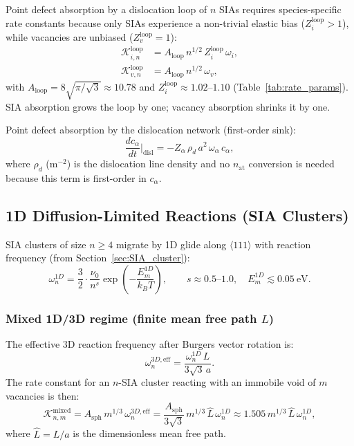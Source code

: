 \documentclass[pdflatex,sn-basic]{sn-jnl} %
\begin{document}
Point defect absorption by a dislocation loop of $n$ SIAs requires
species-specific rate constants because only SIAs experience a non-trivial
elastic bias ($Z_i^{\mathrm{loop}} > 1$), while vacancies are unbiased
($Z_v^{\mathrm{loop}} = 1$):
\begin{align}
    \mathcal{K}_{i,n}^{\mathrm{loop}}
    &= A_{\mathrm{loop}}\,n^{1/2}\,Z_i^{\mathrm{loop}}\,\omega_i,
    \label{eq:K_loop_i}\\[2pt]
    \mathcal{K}_{v,n}^{\mathrm{loop}}
    &= A_{\mathrm{loop}}\,n^{1/2}\,\omega_v,
    \label{eq:K_loop_v}
\end{align}
with $A_{\mathrm{loop}} = 8\sqrt{\pi/\sqrt{3}} \approx 10.78$ and
$Z_i^{\mathrm{loop}} \approx 1.02$--$1.10$ (Table~\ref{tab:rate_params}).
SIA absorption grows the loop by one; vacancy absorption shrinks it by one.

Point defect absorption by the dislocation network (first-order sink):
\begin{equation}\label{eq:K_disl}
    \frac{dc_\alpha}{dt}\bigg|_{\mathrm{disl}}
    = -Z_\alpha\,\rho_d\,a^2\,\omega_\alpha\,c_\alpha,
\end{equation}
where $\rho_d$ (m$^{-2}$) is the dislocation line density and no
$n_{\mathrm{at}}$ conversion is needed because this term is first-order in
$c_\alpha$.

\subsection{1D Diffusion-Limited Reactions (SIA Clusters)}
\label{sec:K1D}

SIA clusters of size $n \geq 4$ migrate by 1D glide along $\langle111\rangle$
with reaction frequency (from Section~\ref{sec:SIA_cluster}):
\begin{equation}\label{eq:omega_1D}
    \omega_n^{1D} = \frac{3}{2}\cdot\frac{\nu_0}{n^s}
    \exp\!\left(-\frac{E_m^{1D}}{k_BT}\right),
    \qquad s \approx 0.5\text{--}1.0, \quad E_m^{1D} \lesssim 0.05~\text{eV}.
\end{equation}

\subsubsection{Mixed 1D/3D regime (finite mean free path $L$)}

The effective 3D reaction frequency after Burgers vector rotation is:
\begin{equation}\label{eq:omega_3D_eff}
    \omega_n^{3D,\mathrm{eff}}
    = \frac{\omega_n^{1D}\,L}{3\sqrt{3}\,a}.
\end{equation}
The rate constant for an $n$-SIA cluster reacting with an immobile void of $m$
vacancies is then:
\begin{equation}\label{eq:K_mixed}
    \mathcal{K}_{n,m}^{\mathrm{mixed}}
    = A_{\mathrm{sph}}\,m^{1/3}\,\omega_n^{3D,\mathrm{eff}}
    = \frac{A_{\mathrm{sph}}}{3\sqrt{3}}\,m^{1/3}\,\hat{L}\,\omega_n^{1D}
    \approx 1.505\,m^{1/3}\,\hat{L}\,\omega_n^{1D},
\end{equation}
where $\hat{L} = L/a$ is the dimensionless mean free path.
\end{document}

